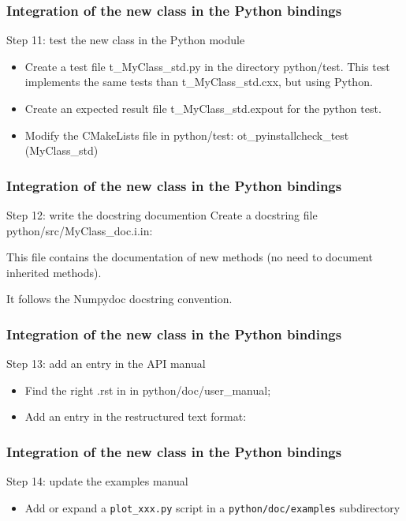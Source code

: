 \documentclass[8pt]{beamer}
\begin{document}
\begin{frame}
  \frametitle{Integration of the new class in the Python bindings}
  \begin{block}{Step 11: test the new class in the Python module}
    \begin{itemize}
    \item Create a test file t\_MyClass\_std.py in the directory python/test. This test implements the same tests than t\_MyClass\_std.cxx, but using Python.
    \item Create an expected result file t\_MyClass\_std.expout for the python test.
    \item Modify the CMakeLists file in python/test:
      {\ttfamily ot\_pyinstallcheck\_test (MyClass\_std)}
    \end{itemize}
  \end{block}
\end{frame}
\begin{frame}[containsverbatim]
  \frametitle{Integration of the new class in the Python bindings}
  \begin{block}{Step 12: write the docstring documention}
    Create a docstring file python/src/MyClass\_doc.i.in:
    
    This file contains the documentation of new methods (no need to document inherited methods).
    
    It follows the Numpydoc docstring convention.
  \end{block}
\end{frame}
\begin{frame}[containsverbatim]
  \frametitle{Integration of the new class in the Python bindings}
  \begin{block}{Step 13: add an entry in the API manual}
    
    \begin{itemize}
    \item Find the right .rst in in python/doc/user\_manual;
    \item Add an entry in the restructured text format:
    \end{itemize}
  \end{block}
\end{frame}
\begin{frame}[containsverbatim]
  \frametitle{Integration of the new class in the Python bindings}
  \begin{block}{Step 14: update the examples manual}    
    \begin{itemize}
    \item Add or expand a \texttt{plot\_xxx.py} script in a \texttt{python/doc/examples} subdirectory
    \end{itemize}
  \end{block}
\end{frame}
\end{document}
